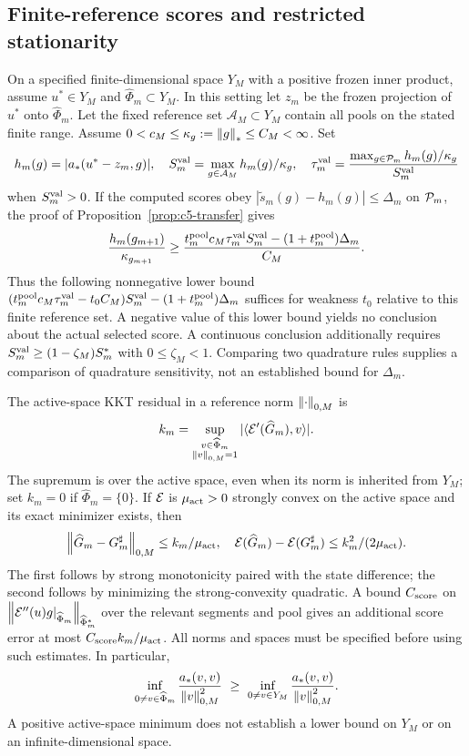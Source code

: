 \documentclass[11pt]{article}
\theoremstyle{remark}
\begin{document}
\subsection{Finite-reference scores and restricted stationarity}
\label{sec:c5-validation}

On a specified finite-dimensional space $Y_M$ with a positive frozen inner
product, assume $u^*\in Y_M$ and $\widehat\Phi_m\subset Y_M$.
In this setting let $z_m$ be the frozen projection of $u^*$ onto
$\widehat\Phi_m$. Let the fixed reference set $\mathcal A_M\subset Y_M$
contain all pools on the stated finite range.
Assume $0<c_M\leq\kappa_g:=\left\lVert g\right\rVert_*\leq C_M<\infty$.
Set
\[
 h_m(g)=|a_*(u^*-z_m,g)|,\quad
 S_m^{\rm val}=\max_{g\in\mathcal A_M}h_m(g)/\kappa_g,\quad
 \tau_m^{\rm val}
   =\frac{\max_{g\in\mathcal P_m}h_m(g)/\kappa_g}{S_m^{\rm val}}
\]
when $S_m^{\rm val}>0$.
If the computed scores obey
$|\widetilde s_m(g)-h_m(g)|\leq\Delta_m$ on $\mathcal P_m$, the proof of
Proposition~\ref{prop:c5-transfer} gives
\begin{equation}
 \frac{h_m(g_{m+1})}{\kappa_{g_{m+1}}}
 \geq
 \frac{t_m^{\rm pool}c_M\tau_m^{\rm val}S_m^{\rm val}
             -(1+t_m^{\rm pool})\Delta_m}{C_M}.
 \label{eq:c5-finite-margin}
\end{equation}
Thus the following nonnegative lower bound
$(t_m^{\rm pool}c_M\tau_m^{\rm val}-t_0C_M)S_m^{\rm val}
 -(1+t_m^{\rm pool})\Delta_m$ suffices for weakness $t_0$
relative to this finite reference set.
A negative value of this lower bound yields no conclusion about the actual selected score.
A continuous conclusion additionally requires
$S_m^{\rm val}\geq(1-\zeta_M)S_m^*$ with $0\leq\zeta_M<1$.
Comparing two quadrature rules supplies a comparison of quadrature sensitivity, not an established bound for $\Delta_m$.

The active-space KKT residual in a reference norm $\left\lVert\cdot\right\rVert_{0,M}$ is
\begin{equation}
 k_m=\sup_{\substack{v\in\widehat\Phi_m\\\left\lVert v\right\rVert_{0,M}=1}}
              |\langle\mathcal E'(\widehat G_m),v\rangle|.
 \label{eq:c5-kkt}
\end{equation}
The supremum is over the active space, even when its norm is inherited
from $Y_M$; set $k_m=0$ if $\widehat\Phi_m=\{0\}$.
If $\mathcal E$ is $\mu_{\rm act}>0$ strongly convex on the active
space and its exact minimizer exists, then
\[
 \left\lVert\widehat G_m-G_m^\sharp\right\rVert_{0,M}\leq k_m/\mu_{\rm act},\quad
 \mathcal E(\widehat G_m)-\mathcal E(G_m^\sharp)\leq k_m^2/(2\mu_{\rm act}).
\]
The first follows by strong monotonicity paired with the state difference;
the second follows by minimizing the strong-convexity quadratic.
A bound $C_{\rm score}$ on
$\left\lVert\mathcal E''(u)g|_{\widehat\Phi_m}\right\rVert_{\widehat\Phi_m^*}$ over the
relevant segments and pool gives an additional score error at most
$C_{\rm score}k_m/\mu_{\rm act}$.
All norms and spaces must be specified before using such estimates.
In particular,
\[
 \inf_{0\ne v\in\widehat\Phi_m}\frac{a_*(v,v)}{\left\lVert v\right\rVert_{0,M}^2}
 \ \geq\
 \inf_{0\ne v\in Y_M}\frac{a_*(v,v)}{\left\lVert v\right\rVert_{0,M}^2}.
\]
A positive active-space minimum does not establish a lower bound on $Y_M$
or on an infinite-dimensional space.
\end{document}
